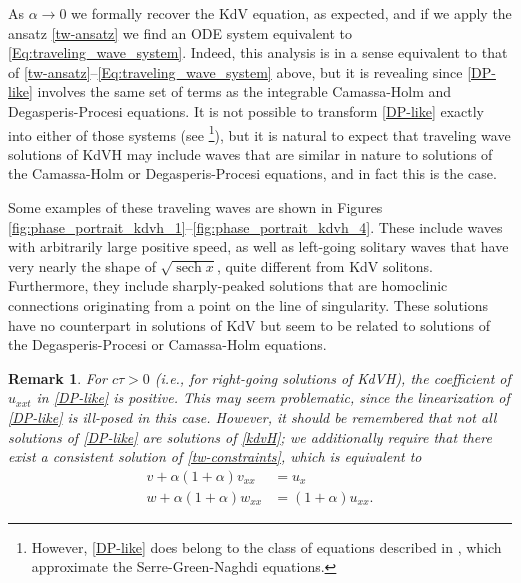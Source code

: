 \documentclass{article}
\DeclareMathOperator{\sech}{sech}
\newcommand{\ctau}{\alpha}
\newtheorem{remark}{Remark}
\begin{document}
As $\ctau \to 0$ we formally recover the KdV equation, as expected, and if we apply the ansatz
\eqref{tw-ansatz} we find an ODE system equivalent to \eqref{Eq:traveling_wave_system}.
Indeed, this analysis is in a sense equivalent to that of \eqref{tw-ansatz}--\eqref{Eq:traveling_wave_system} above, but it
is revealing since \eqref{DP-like} involves the same set of terms
as the integrable Camassa-Holm and Degasperis-Procesi equations.  It is not possible to transform
\eqref{DP-like} exactly into either of those systems (see \cite[Dfns. 1--2]{constantin2009hydrodynamical}\footnote{However, \eqref{DP-like} does belong to the class of equations described in \cite[Prop. 2]{constantin2009hydrodynamical},
which approximate the Serre-Green-Naghdi equations.}),
but it is natural to expect that traveling wave solutions of KdVH may include waves
that are similar in nature to solutions of the Camassa-Holm or Degasperis-Procesi equations, and in fact this is the case.

Some examples of these traveling waves are shown in Figures \ref{fig:phase_portrait_kdvh_1}--\ref{fig:phase_portrait_kdvh_4}.
These include waves with arbitrarily large
positive speed, as well as left-going solitary waves that
have very nearly the shape of $\sqrt{\sech{x}}$, quite different from KdV solitons.
Furthermore, they include sharply-peaked solutions that are homoclinic connections
originating from a point on the line of singularity.
These solutions have no counterpart in solutions of KdV but seem to be related to solutions of
the Degasperis-Procesi or Camassa-Holm equations.

\begin{remark}
    For $c\tau>0$ (i.e., for right-going solutions of KdVH), the coefficient of $u_{xxt}$ in \eqref{DP-like}
    is positive.  This may seem problematic, since the linearization of \eqref{DP-like} is ill-posed in this
    case.  However, it should be remembered that not all solutions of \eqref{DP-like} are solutions of \eqref{kdvH};
    we additionally require that there exist a consistent solution of \eqref{tw-constraints}, which is equivalent to
    \begin{align*}
        v + \alpha(1+\alpha) v_{xx} & = u_x \\
        w + \alpha(1+\alpha) w_{xx} & = (1+\alpha) u_{xx}.
    \end{align*}
\end{remark}
\end{document}
